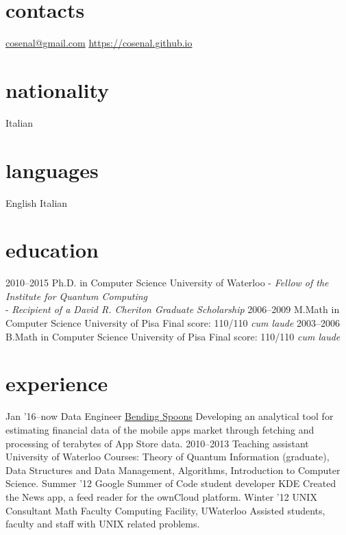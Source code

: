 \documentclass[]{friggeri-cv}
\begin{document}
\begin{aside}
  \section{contacts}
    \href{mailto:cosenal@gmail.com}{cosenal@gmail.com}
    \href{https://cosenal.github.io}{https://cosenal.github.io}
  \section{nationality}
    Italian
  \section{languages}
    English
    Italian
\end{aside}

\section{education}
\begin{entrylist}
  \entry
    {2010–2015}
    {Ph.D. {\normalfont in Computer Science}}
    {University of Waterloo}
    {- \emph{Fellow of the Institute for Quantum Computing}\\
     - \emph{Recipient of a David R. Cheriton Graduate Scholarship}}
  \entry
    {2006–2009}
    {M.Math {\normalfont in Computer Science}}
    {University of Pisa}
    {Final score: 110/110 \emph{cum laude}}
  \entry
    {2003–2006}
    {B.Math {\normalfont in Computer Science}}
    {University of Pisa}
    {Final score: 110/110 \emph{cum laude}}
\end{entrylist}

\section{experience}

\begin{entrylist}
  \entry
  {Jan '16–now}
  {Data Engineer}
  {\href{http://www.bendingspoons.com}{Bending Spoons}}
  {Developing an analytical tool for estimating financial data of the mobile apps market through fetching and processing of terabytes of App Store data. }
  \entry
    {2010–2013}
    {Teaching assistant}
    {University of Waterloo}
    {Courses: Theory of Quantum Information (graduate), Data Structures and Data Management, Algorithms, Introduction to Computer Science.}
  \entry
    {Summer '12}
    {Google Summer of Code student developer}
    {KDE}
    {Created the News app, a feed reader for the ownCloud platform.}
  \entry
    {Winter '12}
    {UNIX Consultant}
    {Math Faculty Computing Facility, UWaterloo}
    {Assisted students, faculty and staff with UNIX related problems.}
\end{entrylist}
\end{document}
